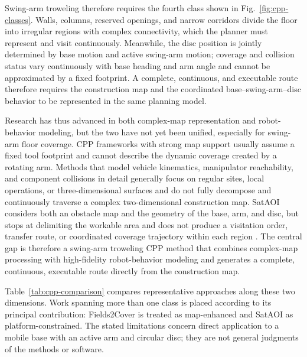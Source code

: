 Swing-arm troweling therefore requires the fourth class shown in Fig.~\ref{fig:cpp-classes}. Walls, columns, reserved openings, and narrow corridors divide the floor into irregular regions with complex connectivity, which the planner must represent and visit continuously. Meanwhile, the disc position is jointly determined by base motion and active swing-arm motion; coverage and collision status vary continuously with base heading and arm angle and cannot be approximated by a fixed footprint. A complete, continuous, and executable route therefore requires the construction map and the coordinated base--swing-arm--disc behavior to be represented in the same planning model.

Research has thus advanced in both complex-map representation and robot-behavior modeling, but the two have not yet been unified, especially for swing-arm floor coverage. CPP frameworks with strong map support usually assume a fixed tool footprint and cannot describe the dynamic coverage created by a rotating arm. Methods that model vehicle kinematics, manipulator reachability, and component collisions in detail generally focus on regular sites, local operations, or three-dimensional surfaces and do not fully decompose and continuously traverse a complex two-dimensional construction map. SatAOI considers both an obstacle map and the geometry of the base, arm, and disc, but stops at delimiting the workable area and does not produce a visitation order, transfer route, or coordinated coverage trajectory within each region \cite{lin2025}. The central gap is therefore a swing-arm troweling CPP method that combines complex-map processing with high-fidelity robot-behavior modeling and generates a complete, continuous, executable route directly from the construction map.

Table~\ref{tab:cpp-comparison} compares representative approaches along these two dimensions. Work spanning more than one class is placed according to its principal contribution: Fields2Cover is treated as map-enhanced and SatAOI as platform-constrained. The stated limitations concern direct application to a mobile base with an active arm and circular disc; they are not general judgments of the methods or software.


